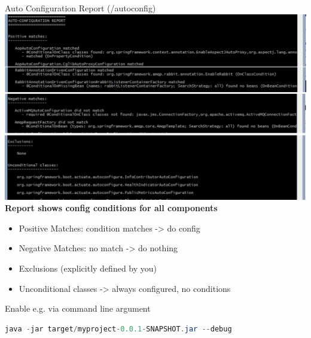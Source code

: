 \begin{frame}[fragile]{Auto Configuration Report (/autoconfig)}
	\includegraphics[trim=10 400 30 0,clip,width=\textwidth]{../SpringBoot/images/SpringBoot_AutoConfigurationReport}
\vfill
\textbf{Report shows config conditions for all components}
\footnotesize
\begin{itemize}
	\item Positive Matches: condition matches -> do config
	\item Negative Matches: no match -> do nothing
	\item Exclusions (explicitly defined by you)
	\item Unconditional classes -> always configured, no conditions
\end{itemize}

\begin{block}{Enable e.g. via command line argument}
\begin{lstlisting}[language=java,belowskip=-4mm,aboveskip=-1mm]
java -jar target/myproject-0.0.1-SNAPSHOT.jar --debug
\end{lstlisting} 
\end{block}
\vfill
\end{frame}



